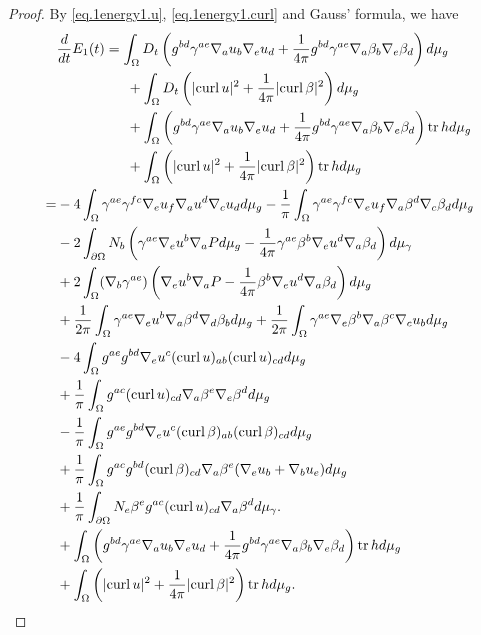\documentclass[12pt,reqno]{amsart}
\numberwithin{equation}{section}
\theoremstyle{definition}
\theoremstyle{remark}
\begin{document}
\begin{proof}
  By \eqref{eq.1energy1.u}, \eqref{eq.1energy1.curl} and Gauss' formula, we have
  \begin{align}
    &\frac{d}{dt}E_1(t)=\int_\Omega D_t\left(g^{bd}\gamma^{ae}{\nabla}_a u_b{\nabla}_e u_d+\frac{1}{4\pi}g^{bd}\gamma^{ae}{\nabla}_a \beta_b{\nabla}_e \beta_d\right)d\mu_g{\nonumber}\\
    &\qquad\qquad\quad+\int_\Omega D_t\left(|{\mathrm{curl}\,} u|^2+\frac{1}{4\pi}|{\mathrm{curl}\,} \beta|^2\right)d\mu_g{\nonumber}\\
    &\qquad\qquad\quad+\int_\Omega \left(g^{bd}\gamma^{ae}{\nabla}_a u_b{\nabla}_e u_d+\frac{1}{4\pi}g^{bd}\gamma^{ae}{\nabla}_a \beta_b{\nabla}_e \beta_d\right){\mathrm{tr}\,} h d\mu_g{\nonumber}\\
   &\qquad\qquad\quad+\int_\Omega \left(|{\mathrm{curl}\,} u|^2+\frac{1}{4\pi}|{\mathrm{curl}\,} \beta|^2\right){\mathrm{tr}\,} h d\mu_g{\nonumber}\\
   =&-4\int_\Omega\gamma^{ae}\gamma^{fc}{\nabla}_eu_f{\nabla}_a u^d{\nabla}_c u_d d\mu_g -\frac{1}{\pi}\int_\Omega\gamma^{ae}\gamma^{fc}{\nabla}_eu_f{\nabla}_a \beta^d{\nabla}_c \beta_d  d\mu_g{\nonumber}\\
  &-2\int_{{\partial}\Omega}N_b\left(\gamma^{ae}{\nabla}_e u^b{\nabla}_a{P }  d\mu_g-\frac{1}{4\pi}\gamma^{ae}\beta^b{\nabla}_e u^d{\nabla}_a\beta_d\right) d\mu_\gamma \label{energy.1.2}\\
  &+2\int_\Omega({\nabla}_b\gamma^{ae})\left({\nabla}_e u^b{\nabla}_a{P } -\frac{1}{4\pi}\beta^b{\nabla}_e u^d{\nabla}_a\beta_d\right) d\mu_g \label{energy.1.3}\\
  &+\frac{1}{2\pi}\int_\Omega\gamma^{ae}{\nabla}_e u^b{\nabla}_a\beta^d {\nabla}_d\beta_b d\mu_g+\frac{1}{2\pi}\int_\Omega\gamma^{ae}{\nabla}_e\beta^b{\nabla}_a\beta^c{\nabla}_c u_b d\mu_g{\nonumber}\\
  &-4\int_\Omega g^{ae}g^{bd}{\nabla}_eu^c({\mathrm{curl}\,} u)_{ab}({\mathrm{curl}\,} u)_{cd} d\mu_g{\nonumber}\\
  &+\frac{1}{\pi}\int_\Omega g^{ac}({\mathrm{curl}\,} u)_{cd}{\nabla}_a\beta^e {\nabla}_e\beta^d d\mu_g{\nonumber}\\
  &-\frac{1}{\pi}\int_\Omega g^{ae}g^{bd}{\nabla}_eu^c({\mathrm{curl}\,} \beta)_{ab}({\mathrm{curl}\,} \beta)_{cd} d\mu_g{\nonumber}\\
  &+\frac{1}{\pi}\int_\Omega g^{ac}g^{bd}({\mathrm{curl}\,} \beta)_{cd}{\nabla}_a\beta^e({\nabla}_e u_b+{\nabla}_b u_e) d\mu_g{\nonumber}\\
  &+\frac{1}{\pi}\int_{{\partial}\Omega} N_e\beta^e g^{ac}({\mathrm{curl}\,} u)_{cd}{\nabla}_a\beta^d  d\mu_\gamma.\label{energy.1.9}\\
    &+\int_\Omega \left(g^{bd}\gamma^{ae}{\nabla}_a u_b{\nabla}_e u_d+\frac{1}{4\pi}g^{bd}\gamma^{ae}{\nabla}_a \beta_b{\nabla}_e \beta_d\right){\mathrm{tr}\,} h d\mu_g{\nonumber}\\
   &+\int_\Omega \left(|{\mathrm{curl}\,} u|^2+\frac{1}{4\pi}|{\mathrm{curl}\,} \beta|^2\right){\mathrm{tr}\,} h d\mu_g.{\nonumber}
  \end{align}


\end{proof}
\end{document}
